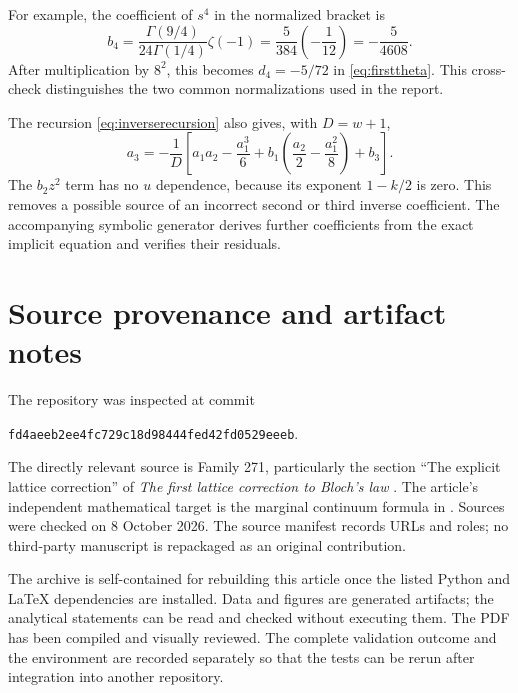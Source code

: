 \documentclass[11pt,a4paper]{article}
\numberwithin{equation}{section}
\theoremstyle{definition}
\begin{document}
For example, the coefficient of $s^4$ in the normalized bracket is
\[
 b_4=\frac{\Gamma(9/4)}{24\Gamma(1/4)}\zeta(-1)
     =\frac{5}{384}\left(-\frac1{12}\right)=-\frac5{4608}.
\]
After multiplication by $8^2$, this becomes $d_4=-5/72$ in
\eqref{eq:firsttheta}. This cross-check distinguishes the two common
normalizations used in the report.

The recursion \eqref{eq:inverserecursion} also gives, with $D=w+1$,
\begin{equation}
 a_3=-\frac1D\left[
 a_1a_2-\frac{a_1^3}{6}
 +b_1\left(\frac{a_2}{2}-\frac{a_1^2}{8}\right)+b_3\right].
 \label{eq:a3}
\end{equation}
The $b_2z^2$ term has no $u$ dependence, because its exponent
$1-k/2$ is zero. This removes a possible source of an incorrect
second or third inverse coefficient. The accompanying symbolic
generator derives further coefficients from the exact implicit
equation and verifies their residuals.

\section{Source provenance and artifact notes}

The repository was inspected at commit
\begin{center}
\small\texttt{fd4aeeb2ee4fc729c18d98444fed42fd0529eeeb}.
\end{center}
The directly relevant source is Family 271, particularly the section
``The explicit lattice correction'' of
\emph{The first lattice correction to Bloch's law} \cite{OAIbloch}.
The article's independent mathematical target is the marginal
continuum formula in \cite{LJ2020}. Sources were checked on
8 October 2026. The source manifest records URLs and roles; no
third-party manuscript is repackaged as an original contribution.

The archive is self-contained for rebuilding this article once the
listed Python and LaTeX dependencies are installed. Data and figures
are generated artifacts; the analytical statements can be read and
checked without executing them. The PDF has been compiled and
visually reviewed. The complete validation outcome and the environment
are recorded separately so that the tests can be rerun after integration
into another repository.
\end{document}
